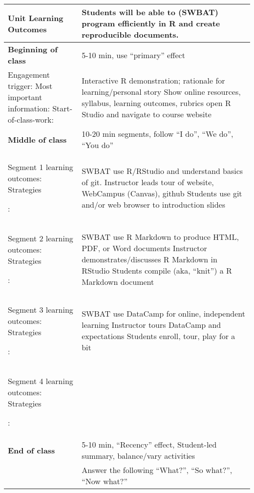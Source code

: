 \documentclass[letterpaper,11pt]{article}
\newcommand\Bshort{\rule[-5ex]{0pt}{0pt}} %
\newcommand\B{\rule[-10ex]{0pt}{0pt}} %
\begin{document}
\begin{tabular}{|p{0.3\linewidth} | p{0.7\linewidth}|}
  \hline
  \textbf{Unit Learning Outcomes} & Students will be able to (SWBAT) program efficiently in R and create reproducible documents. \\
  \hline
  \textbf{Beginning of class} & 5-10 min, use ``primary'' effect
  \\
  \hline
  Engagement trigger: 
  \newline Most important information: 
  \newline Start-of-class-work:
                                  & Interactive R demonstration; rationale for learning/personal story
                                    \newline Show online resources, syllabus, learning outcomes, rubrics
                                    \newline open R Studio and navigate to course website
  \\
  \hline
  \textbf{Middle of class} & 10-20 min segments, follow ``I do'', ``We do'', ``You do''
  \\
  \hline
  Segment 1 learning outcomes: 
  \newline Strategies \B:

                                  & SWBAT use R/RStudio and understand basics of git.
                                    \newline Instructor leads tour of website, WebCampus (Canvas), github
                                    \newline Students use git and/or web browser to introduction slides
  \\
  Segment 2 learning outcomes: 
  \newline Strategies \B:
                                  & SWBAT use R Markdown to produce HTML, PDF, or Word documents
                                    \newline Instructor demonstrates/discusses R Markdown in RStudio
                                    \newline Students compile (aka, ``knit'') a R Markdown document
  \\
  Segment 3 learning outcomes: 
  \newline Strategies \B:
                                  & SWBAT use DataCamp for online, independent learning
                                    \newline Instructor tours DataCamp and expectations
                                    \newline Students enroll, tour, play for a bit
  \\
  Segment 4 learning outcomes:
  \newline Strategies \B:
                                  &
  \\
  \hline
  \textbf{End of class} & 5-10 min, ``Recency'' effect, Student-led summary, balance/vary activities \\
  \hline
  \Bshort
                                  & Answer the following ``What?'', ``So what?'', ``Now what?''
  \\
  \hline
\end{tabular}
\end{document}
